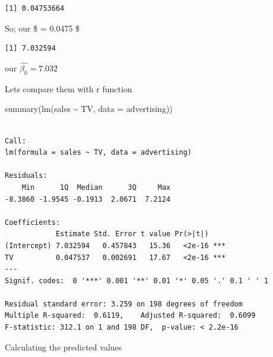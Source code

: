 \documentclass[
  letterpaper,
  DIV=11,
  numbers=noendperiod]{scrreprt}
\newenvironment{Shaded}{\begin{snugshade}}{\end{snugshade}}
\newcommand{\AttributeTok}[1]{\textcolor[rgb]{0.65,0.35,0.00}{#1}}
\newcommand{\DecValTok}[1]{\textcolor[rgb]{0.47,0.16,0.63}{#1}}
\newcommand{\FunctionTok}[1]{\textcolor[rgb]{0.02,0.16,0.49}{#1}}
\newcommand{\NormalTok}[1]{\textcolor[rgb]{0.33,0.33,0.33}{#1}}
\newcommand{\OtherTok}[1]{\textcolor[rgb]{0.85,0.12,0.09}{#1}}
\newcommand{\SpecialCharTok}[1]{\textcolor[rgb]{0.00,0.46,0.62}{#1}}
\begin{document}
\begin{verbatim}
[1] 0.04753664
\end{verbatim}

So; our \$ = 0.0475 \$

\begin{Shaded}
\end{Shaded}

\begin{verbatim}
[1] 7.032594
\end{verbatim}

our \(\hat{\beta_0} = 7.032\)

Lets compare them with r function

\begin{Shaded}
\begin{Highlighting}[]
\FunctionTok{summary}\NormalTok{(}\FunctionTok{lm}\NormalTok{(sales }\SpecialCharTok{\textasciitilde{}}\NormalTok{ TV, }\AttributeTok{data =}\NormalTok{ advertising))}
\end{Highlighting}
\end{Shaded}

\begin{verbatim}

Call:
lm(formula = sales ~ TV, data = advertising)

Residuals:
    Min      1Q  Median      3Q     Max 
-8.3860 -1.9545 -0.1913  2.0671  7.2124 

Coefficients:
            Estimate Std. Error t value Pr(>|t|)    
(Intercept) 7.032594   0.457843   15.36   <2e-16 ***
TV          0.047537   0.002691   17.67   <2e-16 ***
---
Signif. codes:  0 '***' 0.001 '**' 0.01 '*' 0.05 '.' 0.1 ' ' 1

Residual standard error: 3.259 on 198 degrees of freedom
Multiple R-squared:  0.6119,    Adjusted R-squared:  0.6099 
F-statistic: 312.1 on 1 and 198 DF,  p-value: < 2.2e-16
\end{verbatim}

Calculating the predicted values

\begin{Shaded}
\end{Shaded}
\end{document}
